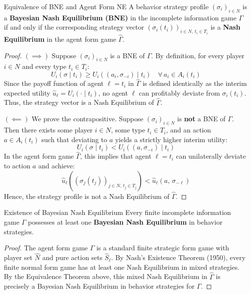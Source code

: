\documentclass[12pt, a4paper]{article}
\begin{document}
\begin{thmbox}{Equivalence of BNE and Agent Form NE}
A behavior strategy profile $(\sigma_i)_{i \in N}$ is a \textbf{Bayesian Nash Equilibrium (BNE)} in the incomplete information game $\Gamma$ if and only if the corresponding strategy vector $(\sigma_i(t_i))_{i \in N,\, t_i \in T_i}$ is a \textbf{Nash Equilibrium} in the agent form game $\hat{\Gamma}$.
\end{thmbox}

\begin{proof}
$(\implies)$ Suppose $(\sigma_i)_{i \in N}$ is a BNE of $\Gamma$. By definition, for every player $i \in N$ and every type $t_i \in T_i$:
\[
  U_i(\sigma \mid t_i) \geq U_i\!\left( (a_i, \sigma_{-i}) \mid t_i \right) \quad \forall\, a_i \in A_i(t_i)
\]
Since the payoff function of agent $\ell = t_i$ in $\hat{\Gamma}$ is defined identically as the interim expected utility $\hat{u}_\ell = U_i(\cdot \mid t_i)$, no agent $\ell$ can profitably deviate from $\sigma_i(t_i)$. Thus, the strategy vector is a Nash Equilibrium of $\hat{\Gamma}$.

$(\impliedby)$ We prove the contrapositive. Suppose $(\sigma_i)_{i \in N}$ is \textbf{not} a BNE of $\Gamma$. Then there exists some player $i \in N$, some type $t_i \in T_i$, and an action $a \in A_i(t_i)$ such that deviating to $a$ yields a strictly higher interim utility:
\[
  U_i(\sigma \mid t_i) < U_i\!\left( (a, \sigma_{-i}) \mid t_i \right)
\]
In the agent form game $\hat{\Gamma}$, this implies that agent $\ell = t_i$ can unilaterally deviate to action $a$ and achieve:
\[
  \hat{u}_\ell\!\left( (\sigma_j(t_j))_{j \in N,\, t_j \in T_j} \right) < \hat{u}_\ell\!\left( a,\, \sigma_{-\ell} \right)
\]
Hence, the strategy profile is not a Nash Equilibrium of $\hat{\Gamma}$.
\end{proof}

\begin{thmbox}{Existence of Bayesian Nash Equilibrium}
Every finite incomplete information game $\Gamma$ possesses at least one \textbf{Bayesian Nash Equilibrium} in behavior strategies.
\end{thmbox}

\begin{proof}
The agent form game $\hat{\Gamma}$ is a standard finite strategic form game with player set $\hat{N}$ and pure action sets $\hat{S}_\ell$. By Nash's Existence Theorem (1950), every finite normal form game has at least one Nash Equilibrium in mixed strategies. By the Equivalence Theorem above, this mixed Nash Equilibrium in $\hat{\Gamma}$ is precisely a Bayesian Nash Equilibrium in behavior strategies for $\Gamma$.
\end{proof}
\end{document}
